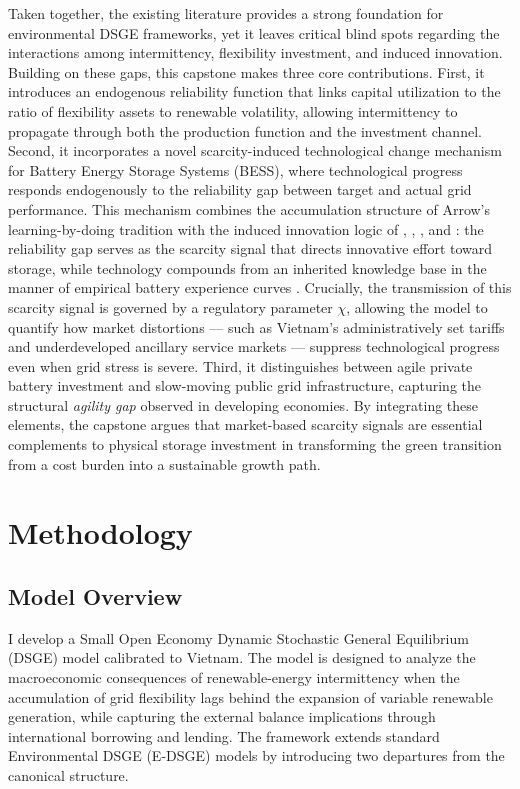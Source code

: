 \documentclass[12pt, a4paper]{article}
\begin{document}
Taken together, the existing literature provides a strong foundation for environmental DSGE frameworks, yet it leaves critical blind spots regarding the interactions among intermittency, flexibility investment, and induced innovation. Building on these gaps, this capstone makes three core contributions. First, it introduces an endogenous reliability function that links capital utilization to the ratio of flexibility assets to renewable volatility, allowing intermittency to propagate through both the production function and the investment channel. Second, it incorporates a novel scarcity-induced technological change mechanism for Battery Energy Storage Systems (BESS), where technological progress responds endogenously to the reliability gap between target and actual grid performance. This mechanism combines the accumulation structure of Arrow's \citeyearpar{arrow1962} learning-by-doing tradition with the induced innovation logic of \citet{hicks1932}, \citet{kennedy1964}, \citet{drandakisphelps1966}, and \citet{acemoglu2002}: the reliability gap serves as the scarcity signal that directs innovative effort toward storage, while technology compounds from an inherited knowledge base in the manner of empirical battery experience curves \citep{kittner2017, way2022}. Crucially, the transmission of this scarcity signal is governed by a regulatory parameter $\chi$, allowing the model to quantify how market distortions --- such as Vietnam's administratively set tariffs and underdeveloped ancillary service markets --- suppress technological progress even when grid stress is severe. Third, it distinguishes between agile private battery investment and slow-moving public grid infrastructure, capturing the structural \textit{agility gap} observed in developing economies. By integrating these elements, the capstone argues that market-based scarcity signals are essential complements to physical storage investment in transforming the green transition from a cost burden into a sustainable growth path.

\section{Methodology} \label{sec:methodology}

\subsection{Model Overview}

I develop a Small Open Economy Dynamic Stochastic General Equilibrium (DSGE) model calibrated to Vietnam. The model is designed to analyze the macroeconomic consequences of renewable-energy intermittency when the accumulation of grid flexibility lags behind the expansion of variable renewable generation, while capturing the external balance implications through international borrowing and lending. The framework extends standard Environmental DSGE (E-DSGE) models by introducing two departures from the canonical structure.
\end{document}
